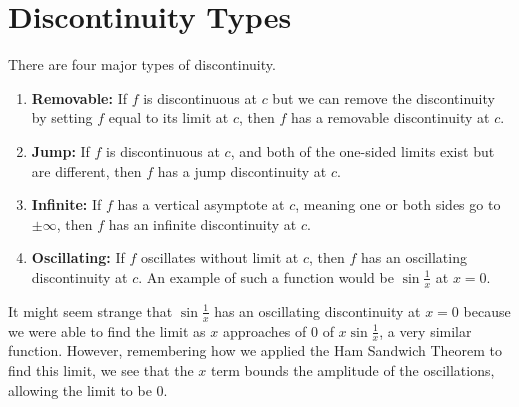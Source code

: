 \section{Discontinuity Types}
There are four major types of discontinuity.
\begin{enumerate}[label=]
	\item \textbf{Removable: } If $f$ is discontinuous at $c$ but we can remove the discontinuity by setting $f$ equal to its limit at $c$, then $f$ has a removable discontinuity at $c$.
	\item \textbf{Jump: } If $f$ is discontinuous at $c$, and both of the one-sided limits exist but are different, then $f$ has a jump discontinuity at $c$.
	\item \textbf{Infinite: } If $f$ has a vertical asymptote at $c$, meaning one or both sides go to $\pm\infty$, then $f$ has an infinite discontinuity at $c$.
	\item \textbf{Oscillating: } If $f$ oscillates without limit at $c$, then $f$ has an oscillating discontinuity at $c$. An example of such a function would be $\sin{\frac{1}{x}}$ at $x=0$.
\end{enumerate}

\noindent
It might seem strange that $\sin{\frac{1}{x}}$ has an oscillating discontinuity at $x=0$ because we were able to find the limit as $x$ approaches of 0 of $x\sin{\frac{1}{x}}$, a very similar function.
However, remembering how we applied the Ham Sandwich Theorem to find this limit, we see that the $x$ term bounds the amplitude of the oscillations, allowing the limit to be $0$.

